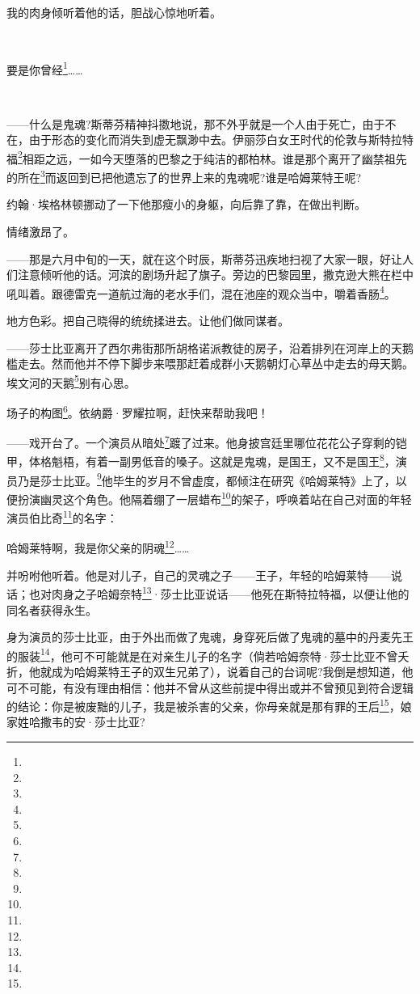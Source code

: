 \par  
\par 我的肉身倾听着他的话，胆战心惊地听着。
\par  
\par 要是你曾经\footnote{}……
\par  
\par ——什么是鬼魂?斯蒂芬精神抖擞地说，那不外乎就是一个人由于死亡，由于不在，由于形态的变化而消失到虚无飘渺中去。伊丽莎白女王时代的伦敦与斯特拉特福\footnote{}相距之远，一如今天堕落的巴黎之于纯洁的都柏林。谁是那个离开了幽禁祖先的所在\footnote{}而返回到已把他遗忘了的世界上来的鬼魂呢?谁是哈姆莱特王呢?
\par 约翰·埃格林顿挪动了一下他那瘦小的身躯，向后靠了靠，在做出判断。
\par 情绪激昂了。
\par ——那是六月中旬的一天，就在这个时辰，斯蒂芬迅疾地扫视了大家一眼，好让人们注意倾听他的话。河滨的剧场升起了旗子。旁边的巴黎园里，撒克逊大熊在栏中吼叫着。跟德雷克一道航过海的老水手们，混在池座的观众当中，嚼着香肠\footnote{}。
\par 地方色彩。把自己晓得的统统揉进去。让他们做同谋者。
\par ——莎士比亚离开了西尔弗街那所胡格诺派教徒的房子，沿着排列在河岸上的天鹅槛走去。然而他并不停下脚步来喂那赶着成群小天鹅朝灯心草丛中走去的母天鹅。埃文河的天鹅\footnote{}别有心思。
\par 场子的构图\footnote{}。依纳爵·罗耀拉啊，赶快来帮助我吧！
\par ——戏开台了。一个演员从暗处\footnote{}踱了过来。他身披宫廷里哪位花花公子穿剩的铠甲，体格魁梧，有着一副男低音的嗓子。这就是鬼魂，是国王，又不是国王\footnote{}，演员乃是莎士比亚。\footnote{}他毕生的岁月不曾虚度，都倾注在研究《哈姆莱特》上了，以便扮演幽灵这个角色。他隔着绷了一层蜡布\footnote{}的架子，呼唤着站在自己对面的年轻演员伯比奇\footnote{}的名字：
\par 哈姆莱特啊，我是你父亲的阴魂\footnote{}……
\par 并吩咐他听着。他是对儿子，自己的灵魂之子——王子，年轻的哈姆莱特——说话；也对肉身之子哈姆奈特\footnote{}·莎士比亚说话——他死在斯特拉特福，以便让他的同名者获得永生。
\par 身为演员的莎士比亚，由于外出而做了鬼魂，身穿死后做了鬼魂的墓中的丹麦先王的服装\footnote{}，他可不可能就是在对亲生儿子的名字（倘若哈姆奈特·莎士比亚不曾夭折，他就成为哈姆莱特王子的双生兄弟了），说着自己的台词呢?我倒是想知道，他可不可能，有没有理由相信：他并不曾从这些前提中得出或并不曾预见到符合逻辑的结论：你是被废黜的儿子，我是被杀害的父亲，你母亲就是那有罪的王后\footnote{}，娘家姓哈撒韦的安·莎士比亚?
